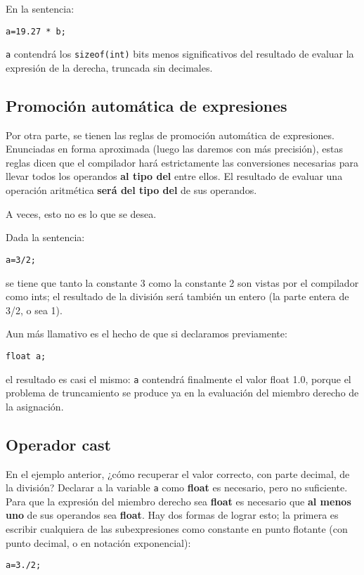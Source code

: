 En la sentencia:
\begin{lstlisting}
a=19.27 * b;	
\end{lstlisting}
\lstinline{a} contendrá los \lstinline{sizeof(int)} bits menos significativos del resultado de evaluar la expresión de la
derecha, truncada sin decimales.

\subsection{Promoción automática de expresiones}

Por otra parte, se tienen las reglas de promoción automática de expresiones. Enunciadas en forma
aproximada (luego las daremos con más precisión), estas reglas dicen que el compilador hará
estrictamente las conversiones necesarias para llevar todos los operandos \textbf{al tipo del } entre ellos. El
resultado de evaluar una operación aritmética \textbf{será del tipo del } de sus operandos.

A veces, esto no es lo que se desea. 

\begin{ejemplo}
Dada la sentencia:
\begin{lstlisting}
a=3/2;
\end{lstlisting}

se tiene que tanto la constante 3 como la constante 2 son vistas por el compilador como ints; el
resultado de la división será también un entero (la parte entera de 3/2, o sea 1). 

Aun más llamativo es el hecho de que si declaramos previamente:
\begin{lstlisting}
float a;
\end{lstlisting}
el resultado es casi el mismo: \lstinline{a} contendrá finalmente el valor float 1.0, porque el problema de truncamiento se produce ya en la evaluación del miembro derecho de la asignación.
\end{ejemplo}


\subsection{Operador cast}
En el ejemplo anterior, ¿cómo recuperar el valor correcto, con parte decimal, de la división? Declarar a la variable \lstinline{a} como \textbf{float} es necesario,
pero no suficiente. Para que la expresión del miembro derecho sea \textbf{float} es necesario que \textbf{al menos uno}
de sus operandos sea \textbf{float}. Hay dos formas de lograr esto; la primera es escribir cualquiera de las
subexpresiones como constante en punto flotante (con punto decimal, o en notación exponencial):
\begin{lstlisting}
a=3./2;
\end{lstlisting}

